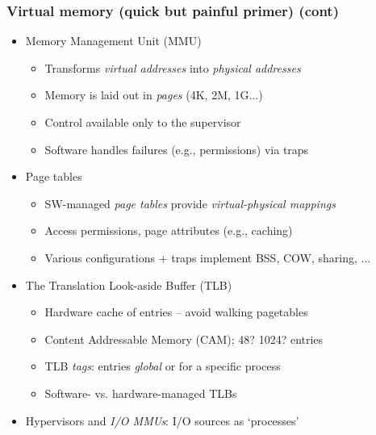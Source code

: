 \begin{frame}
  \frametitle{Virtual memory (quick but painful primer) (cont)}

  \begin{itemize}

    \pause

    \item Memory Management Unit (MMU)
    \begin{itemize}
      \item Transforms \textit{virtual addresses} into \textit{physical addresses}
      \item Memory is laid out in \textit{pages} (4K, 2M, 1G...)
      \item Control available only to the supervisor
      \item Software handles failures (e.g., permissions) via traps
    \end{itemize}

    \medskip
    \pause

    \item Page tables
    \begin{itemize}
      \item SW-managed \textit{page tables} provide \textit{virtual-physical
	mappings}
      \item Access permissions, page attributes (e.g., caching)
      \item Various configurations + traps implement BSS, COW, sharing, ...
    \end{itemize}

    \medskip
    \pause

    \item The Translation Look-aside Buffer (TLB)
    \begin{itemize}
      \item Hardware cache of entries -- avoid walking pagetables
      \item Content Addressable Memory (CAM); 48? 1024? entries
      \item TLB \textit{tags}: entries \textit{global} or for a specific process
      \item Software- vs. hardware-managed TLBs
    \end{itemize}

    \medskip
    \pause

%

    \item Hypervisors and \textit{I/O MMUs}: I/O sources as `processes'
  \end{itemize}
\end{frame}

